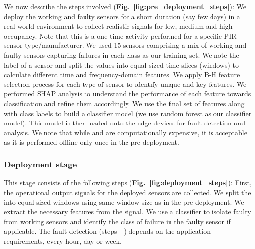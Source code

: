 We now describe the steps involved ({\bfseries Fig.~\ref{fig:pre_deployment_steps}}):
 We deploy the working and faulty sensors for a short duration (say few days) in a real-world environment to collect realistic \aout signals for low, medium and high occupancy. 
Note that this is a one-time activity performed for a specific PIR sensor type/manufacturer. 
We used 15 sensors comprising a mix of working and faulty sensors capturing failures in each class as our training set.
 We note the label of a sensor and split the \aout values into equal-sized time slices (windows) to calculate different time and frequency-domain features. 
 We apply B-H feature selection process for each type of sensor to identify unique and key features. 
 We performed SHAP analysis to understand the performance of each feature towards classification and refine them accordingly. 
 We use the final set of features along with class labels to build a classifier model (we use random forest as our classifier model). This model is then loaded onto the edge devices for fault detection and analysis. We note that while  and  are computationally expensive, it is acceptable as it is performed offline only once in the pre-deployment.

\subsubsection{Deployment stage} 
This stage consists of the following steps ({\bfseries Fig.~\ref{fig:deployment_steps}}): 
 First, the operational \aout output signals for the deployed sensors are collected. 
 We split the \aout into equal-sized windows using same window size as in the pre-deployment. 
 We extract the necessary features from the \aout signal. 
 We use a classifier to \ca isolate faulty from working sensors and \cb identify the class of failure in the faulty sensor if applicable. %
The fault detection (steps  - ) depends on the application requirements, \ie every hour, day or week. 







